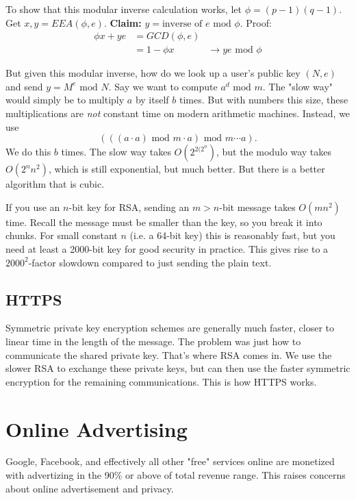 \documentclass[titlepage, 12pt, leqno]{article}
\begin{document}
To show that this modular inverse calculation works, let $\phi = (p-1)(q-1)$. Get 
$x,y = EEA(\phi ,e)$. \textbf{Claim:} $y = \text{inverse of }e \text{ mod }\phi$.
Proof:
\begin{align*}
    \phi x + ye &= GCD(\phi,e) \\
                &= 1 - \phi x
                &\rightarrow ye \text{ mod }\phi 
\end{align*}

But given this modular inverse, how do we look up a user's public key $(N,e)$ and
send $y = M^{e} \text{ mod } N$. Say we want to compute $a^{d} \text{ mod }m$. 
The "slow way" would simply be to multiply $a$ by itself $b$ times. But with 
numbers this size, these multiplications are \textit{not} constant time on modern
arithmetic machines. Instead, we use
\[
\left(\left(\left(a \cdot a\right) \text{ mod }m \cdot a\right) \text{ mod }m
    \cdots a \right).
\]
We do this $b$ times. The slow way takes $O(2^{2(2^{n}})$, but the modulo way
takes $O(2^{n}n^{2})$, which is still exponential, but much better. But there is
a better algorithm that is cubic.

If you use an $n$-bit key for RSA, sending an $m>n$-bit message takes $O(mn^{2})$
time. Recall the message must be smaller than the key, so you break it into 
chunks. For small constant $n$ (i.e. a 64-bit key) this is reasonably fast, but
you need at least a 2000-bit key for good security in practice. This gives rise
to a $2000^{2}$-factor slowdown compared to just sending the plain text.

\subsection{HTTPS}
Symmetric private key encryption schemes are generally much faster, closer to
linear time in the length of the message. The problem was just how to communicate
the shared private key. That's where RSA comes in. We use the slower RSA to 
exchange these private keys, but can then use the faster symmetric encryption
for the remaining communications. This is how HTTPS works.

\pagebreak
\section{Online Advertising}

Google, Facebook, and effectively all other "free" services online are monetized
with advertizing in the 90\% or above of total revenue range. This raises
concerns about online advertisement and privacy.
\end{document}

